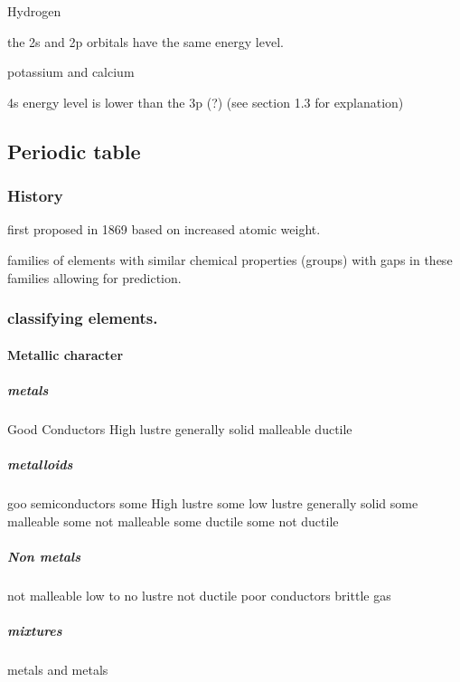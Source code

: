 \documentclass[]{article}
\let\oldparagraph\paragraph
\renewcommand{\paragraph}[1]{\oldparagraph{#1}\mbox{}}
\let\oldsubparagraph\subparagraph
\renewcommand{\subparagraph}[1]{\oldsubparagraph{#1}\mbox{}}
\begin{document}
Hydrogen

the 2s and 2p orbitals have the same energy level.

potassium and calcium

4s energy level is lower than the 3p (?) (see section 1.3 for
explanation)

\hypertarget{periodic-table}{%
\subsection{Periodic table}\label{periodic-table}}

\hypertarget{history}{%
\subsubsection{History}\label{history}}

first proposed in 1869 based on increased atomic weight.

families of elements with similar chemical properties (groups) with gaps
in these families allowing for prediction.

\hypertarget{classifying-elements.}{%
\subsubsection{classifying elements.}\label{classifying-elements.}}

\hypertarget{metallic-character}{%
\paragraph{Metallic character}\label{metallic-character}}

\hypertarget{metals}{%
\subparagraph{metals}\label{metals}}

Good Conductors High lustre generally solid malleable ductile

\hypertarget{metalloids}{%
\subparagraph{metalloids}\label{metalloids}}

goo semiconductors some High lustre some low lustre generally solid some
malleable some not malleable some ductile some not ductile

\hypertarget{non-metals}{%
\subparagraph{Non metals}\label{non-metals}}

not malleable low to no lustre not ductile poor conductors brittle gas

\hypertarget{mixtures}{%
\subparagraph{mixtures}\label{mixtures}}

metals and metals
\end{document}
